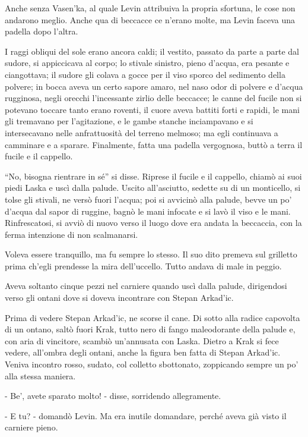 Anche senza Vasen'ka, al quale Levin attribuiva la propria sfortuna, le cose non andarono meglio. Anche qua di beccacce ce n'erano molte, ma Levin faceva una padella dopo l'altra. 

I raggi obliqui del sole erano ancora caldi; il vestito, passato da parte a parte dal sudore, si appiccicava al corpo; lo stivale sinistro, pieno d'acqua, era pesante e ciangottava; il sudore gli colava a gocce per il viso sporco del sedimento della polvere; in bocca aveva un certo sapore amaro, nel naso odor di polvere e d'acqua rugginosa, negli orecchi l'incessante zirlio delle beccacce; le canne del fucile non si potevano toccare tanto erano roventi, il cuore aveva battiti forti e rapidi, le mani gli tremavano per l'agitazione, e le gambe stanche inciampavano e si intersecavano nelle anfrattuosità del terreno melmoso; ma egli continuava a camminare e a sparare. Finalmente, fatta una padella vergognosa, buttò a terra il fucile e il cappello. 

``No, bisogna rientrare in sé'' si disse. Riprese il fucile e il cappello, chiamò ai suoi piedi Laska e uscì dalla palude. Uscito all'asciutto, sedette su di un monticello, si tolse gli stivali, ne versò fuori l'acqua; poi si avvicinò alla palude, bevve un po' d'acqua dal sapor di ruggine, bagnò le mani infocate e si lavò il viso e le mani. Rinfrescatosi, si avviò di nuovo verso il luogo dove era andata la beccaccia, con la ferma intenzione di non scalmanarsi. 

Voleva essere tranquillo, ma fu sempre lo stesso. Il suo dito premeva sul grilletto prima ch'egli prendesse la mira dell'uccello. Tutto andava di male in peggio. 

Aveva soltanto cinque pezzi nel carniere quando uscì dalla palude, dirigendosi verso gli ontani dove si doveva incontrare con Stepan Arkad'ic. 

Prima di vedere Stepan Arkad'ic, ne scorse il cane. Di sotto alla radice capovolta di un ontano, saltò fuori Krak, tutto nero di fango maleodorante della palude e, con aria di vincitore, scambiò un'annusata con Laska. Dietro a Krak si fece vedere, all'ombra degli ontani, anche la figura ben fatta di Stepan Arkad'ic. Veniva incontro rosso, sudato, col colletto sbottonato, zoppicando sempre un po' alla stessa maniera. 

- Be', avete sparato molto! - disse, sorridendo allegramente. 

- E tu? - domandò Levin. Ma era inutile domandare, perché aveva già visto il carniere pieno. 

